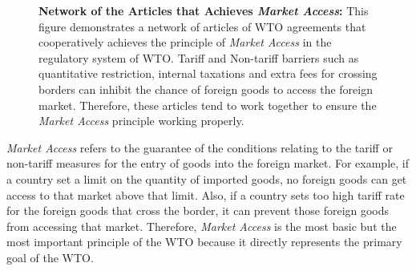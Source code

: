  
\begin{figure}[ht]
    \centering{
        
    }
    \caption{{\bf Network of the Articles that Achieves \textit{Market Access}:}
        This figure demonstrates a network of articles of WTO agreements
        that cooperatively achieves the principle of \textit{Market Access} in the regulatory system of WTO.
        Tariff and Non-tariff barriers such as quantitative restriction, internal taxations
        and extra fees for crossing borders can inhibit the chance of foreign goods to access the foreign market.
        Therefore, these articles tend to work together to ensure the \textit{Market Access} principle working properly.
    }
    \label{fig:market-aceess_directed}
  \end{figure}
 \textit{Market Access}
 refers to the guarantee of the conditions relating to the
 tariff or non-tariff measures
 for the entry of
 goods into the foreign market. For example, if
 a country set a limit on the quantity of imported goods, no foreign goods can get access to that market above that limit. Also, if a country sets too high tariff rate for the foreign goods that cross the border,
 it can prevent those foreign goods from accessing that market.
 Therefore, \textit{Market Access} is the most basic but the most important principle of the WTO
 because it directly represents the primary goal of the WTO.
  
